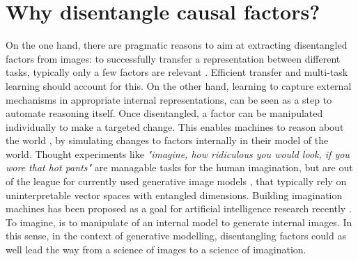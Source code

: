 \section{Why disentangle causal factors?}
	On the one hand, there are pragmatic reasons to aim at extracting disentangled factors from images: to successfully transfer a representation between different tasks, typically only a few factors are relevant \cite{Bengio:2013bu}.
	Efficient transfer and multi-task learning should account for this.
	On the other hand, learning to capture external mechanisms in appropriate internal representations, can be seen as a step to automate reasoning itself.
	Once disentangled, a factor can be manipulated individually to make a targeted change.
	This enables machines to reason about the world \cite{Pearl:2018im}, by simulating changes to factors internally in their model of the world.
	Thought experiments like \textit{"imagine, how ridiculous you would look, if you wore that hot pants"} are managable tasks for the human imagination, but are out of the league for currently used generative image models \cite{Goodfellow:2014td, Kingma:2013tz}, that typically rely on uninterpretable vector spaces with entangled dimensions.
	Building imagination machines has been proposed as a goal for artificial intelligence research recently \cite{Mahadevan:2018tz}.
	To imagine, is to manipulate of an internal model to generate internal images.
	In this sense, in the context of generative modelling, disentangling factors could as well lead the way from a science of images to a science of imagination.


